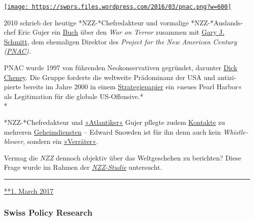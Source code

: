\href{https://swprs.org/2017/03/01/nzz-new-american-century/}{\texttt{[image: https://swprs.files.wordpress.com/2016/03/pnac.png?w=600]}}

2010 schrieb der heutige *NZZ-*Chef­re­dakteur und vor­ma­lige
*NZZ-*Aus­lands­chef Eric Gujer ein
\href{https://www.amazon.com/Safety-Liberty-Islamist-Terrorism-Counterterrorism/dp/084474333X}{Buch}
über den \emph{War on Terror} zu­sammen mit
\href{https://en.wikipedia.org/wiki/Gary_Schmitt}{Gary J. Schmitt}, dem
ehe­ma­li­gen Dir­ektor des \emph{Project for the New American Century
(\href{https://en.wikipedia.org/wiki/Project_for_the_New_American_Century}{PNAC}).}

PNAC wurde 1997 von füh­ren­den Neo­kon­ser­va­ti­ven ge­gründet,
darunter \href{https://de.wikipedia.org/wiki/Dick_Cheney}{Dick Cheney}.
Die Gruppe for­derte die weltweite Prädominanz der USA und
anti­zi­pierte be­reits im Jahre 2000 in ei­nem
\href{https://web.archive.org/web/20130817122719/http://www.newamericancentury.org/RebuildingAmericasDefenses.pdf}{Stra­tegie­­papier}
ein »neues Pearl Harbor« als Legi­ti­ma­tion für die globale
US-Offensive.*\\
*

*NZZ-*Chef­redakteur und
\href{http://bazonline.ch/schweiz/Ein-Atlantiker-an-der-Spitze/story/18216373}{»Atlan­ti­ker«}
Gujer pf‌legte zudem \href{https://www.taz.de/!430263/}{Kon­takte} zu
mehreren
\href{https://web.archive.org/web/20150515195718/http://www.schweizamsonntag.ch/ressort/medien/nzz-chefredaktor_gujer_und_der_geheimdienst/}{Ge­heim­dien­s­ten}
-- Edward Snow­den ist für ihn denn auch kein \emph{Whistle­blower,}
sondern ein
\href{http://www.nzz.ch/schweiz/bern-ist-nicht-bagdad-1.18122326}{»Ver­rä­ter«}.

Vermag die \emph{NZZ} den­noch ob­jek­tiv über das Welt­ge­sche­hen zu
berichten? Diese Frage wur­de im Rah­men der
\emph{\href{https://swprs.org/die-nzz-studie/}{NZZ-Studie}} untersucht.

\begin{center}\rule{0.5\linewidth}{\linethickness}\end{center}

\href{https://swprs.org/2017/03/01/nzz-new-american-century/}{**1. March
2017}

\hypertarget{swiss-policy-research}{%
\subsubsection{Swiss Policy Research}\label{swiss-policy-research}}

